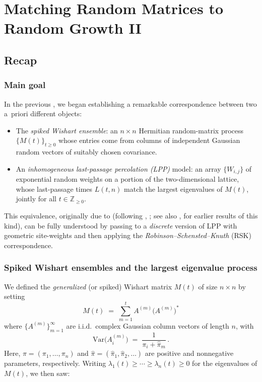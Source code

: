 \documentclass[letterpaper,11pt,oneside,reqno]{book}
\numberwithin{equation}{chapter}  %
\theoremstyle{definition}
\begin{document}
\chapter{Matching Random Matrices to Random Growth II}
\label{chap:lecture14}






\section{Recap}

\subsection{Main goal}

In the previous
, we began establishing a remarkable correspondence between two a~priori different objects:

\begin{itemize}
\item The \emph{spiked Wishart ensemble}: an $n\times n$ Hermitian random-matrix process $\{M(t)\}_{t\ge0}$ whose entries come from columns of independent Gaussian random vectors of suitably chosen covariance.
\item An \emph{inhomogeneous last-passage percolation (LPP)} model: an array $\{W_{i,j}\}$ of exponential random weights on a portion of the two-dimensional lattice, whose last-passage times $L(t,n)$ match the largest eigenvalues of $M(t)$, jointly for all $t\in \mathbb{Z}_{\ge0}$.
\end{itemize}

This equivalence, originally due to
\cite{dieker2008largest} (following
\cite{defosseux2010orbit}, \cite{forrester2006jacobians};
see also
\cite{Baryshnikov_GUE2001},
\cite{johansson2000shape} for earlier results of this kind),
can be fully understood by passing to a
\emph{discrete} version of LPP with geometric site-weights
and then applying the \emph{Robinson--Schensted--Knuth}
(RSK) correspondence.

\subsection{Spiked Wishart ensembles and the largest eigenvalue process}

We defined the \emph{generalized} (or spiked) Wishart matrix $M(t)$ of size $n\times n$ by setting
\[
M(t)\;=\;\sum_{m=1}^t A^{(m)}\bigl(A^{(m)}\bigr)^*
\]
where $\{A^{(m)}\}_{m=1}^\infty$ are i.i.d.\ complex Gaussian column vectors of length $n$, with
\[
\mathrm{Var}\bigl(A^{(m)}_i\bigr)
\;=\;
\frac{1}{\pi_i + \hat\pi_m}\,.
\]
Here, $\pi=(\pi_1,\dots,\pi_n)$ and $\hat\pi=(\hat\pi_1,\hat\pi_2,\dots)$ are positive and nonnegative parameters, respectively.  Writing $\lambda_1(t)\ge\cdots\ge\lambda_n(t)\ge0$ for the eigenvalues of $M(t)$, we then saw:
\end{document}
